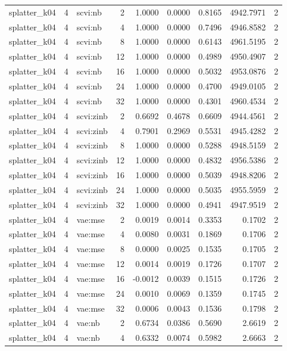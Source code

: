 \begin{tabular}{lrlrrrrrr}
splatter\_k04 & 4 & scvi:nb & 2 & 1.0000 & 0.0000 & 0.8165 & 4942.7971 & 2 \\
splatter\_k04 & 4 & scvi:nb & 4 & 1.0000 & 0.0000 & 0.7496 & 4946.8582 & 2 \\
splatter\_k04 & 4 & scvi:nb & 8 & 1.0000 & 0.0000 & 0.6143 & 4961.5195 & 2 \\
splatter\_k04 & 4 & scvi:nb & 12 & 1.0000 & 0.0000 & 0.4989 & 4950.4907 & 2 \\
splatter\_k04 & 4 & scvi:nb & 16 & 1.0000 & 0.0000 & 0.5032 & 4953.0876 & 2 \\
splatter\_k04 & 4 & scvi:nb & 24 & 1.0000 & 0.0000 & 0.4700 & 4949.0105 & 2 \\
splatter\_k04 & 4 & scvi:nb & 32 & 1.0000 & 0.0000 & 0.4301 & 4960.4534 & 2 \\
splatter\_k04 & 4 & scvi:zinb & 2 & 0.6692 & 0.4678 & 0.6609 & 4944.4561 & 2 \\
splatter\_k04 & 4 & scvi:zinb & 4 & 0.7901 & 0.2969 & 0.5531 & 4945.4282 & 2 \\
splatter\_k04 & 4 & scvi:zinb & 8 & 1.0000 & 0.0000 & 0.5288 & 4948.5159 & 2 \\
splatter\_k04 & 4 & scvi:zinb & 12 & 1.0000 & 0.0000 & 0.4832 & 4956.5386 & 2 \\
splatter\_k04 & 4 & scvi:zinb & 16 & 1.0000 & 0.0000 & 0.5039 & 4948.8206 & 2 \\
splatter\_k04 & 4 & scvi:zinb & 24 & 1.0000 & 0.0000 & 0.5035 & 4955.5959 & 2 \\
splatter\_k04 & 4 & scvi:zinb & 32 & 1.0000 & 0.0000 & 0.4941 & 4947.9519 & 2 \\
splatter\_k04 & 4 & vae:mse & 2 & 0.0019 & 0.0014 & 0.3353 & 0.1702 & 2 \\
splatter\_k04 & 4 & vae:mse & 4 & 0.0080 & 0.0031 & 0.1869 & 0.1706 & 2 \\
splatter\_k04 & 4 & vae:mse & 8 & 0.0000 & 0.0025 & 0.1535 & 0.1705 & 2 \\
splatter\_k04 & 4 & vae:mse & 12 & 0.0014 & 0.0019 & 0.1726 & 0.1707 & 2 \\
splatter\_k04 & 4 & vae:mse & 16 & -0.0012 & 0.0039 & 0.1515 & 0.1726 & 2 \\
splatter\_k04 & 4 & vae:mse & 24 & 0.0010 & 0.0069 & 0.1359 & 0.1745 & 2 \\
splatter\_k04 & 4 & vae:mse & 32 & 0.0006 & 0.0043 & 0.1536 & 0.1798 & 2 \\
splatter\_k04 & 4 & vae:nb & 2 & 0.6734 & 0.0386 & 0.5690 & 2.6619 & 2 \\
splatter\_k04 & 4 & vae:nb & 4 & 0.6332 & 0.0074 & 0.5982 & 2.6663 & 2 \\

\end{tabular}
